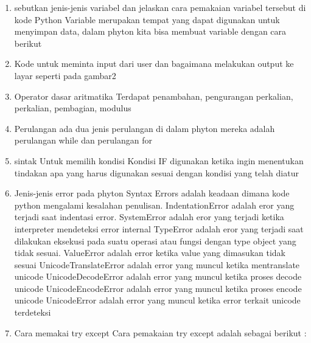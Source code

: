 \begin{enumerate}

\item sebutkan jenis-jenis variabel dan jelaskan cara pemakaian variabel tersebut di kode Python
Variable merupakan tempat yang dapat digunakan untuk menyimpan data, dalam phyton kita bisa membuat variable dengan cara berikut


\item Kode untuk meminta input dari user dan bagaimana melakukan output ke layar seperti pada gambar2


\item Operator dasar aritmatika
Terdapat penambahan, pengurangan perkalian, perkalian, pembagian, modulus



\item Perulangan
ada dua jenis perulangan di dalam phyton mereka adalah perulangan while dan perulangan for


\item sintak Untuk memilih kondisi
Kondisi IF digunakan ketika ingin menentukan tindakan apa yang harus digunakan sesuai dengan kondisi yang telah diatur



\item Jenis-jenis error pada phyton
Syntax Errors adalah keadaan dimana kode python mengalami kesalahan penulisan. 
IndentationError adalah eror yang terjadi saat indentasi error.
SystemError adalah eror yang terjadi ketika interpreter mendeteksi error internal
TypeError adalah eror yang terjadi saat dilakukan eksekusi pada suatu operasi atau fungsi dengan type object yang tidak sesuai.
ValueError adalah error ketika value yang dimasukan tidak sesuai
UnicodeTranslateError adalah error yang muncul ketika mentranslate unicode
UnicodeDecodeError adalah error yang muncul ketika  proses decode unicode
UnicodeEncodeError adalah error yang muncul ketika  proses encode unicode
UnicodeError adalah error yang muncul ketika error terkait unicode terdeteksi

\item Cara memakai try except
Cara pemakaian try except adalah sebagai berikut :



\end{enumerate}

